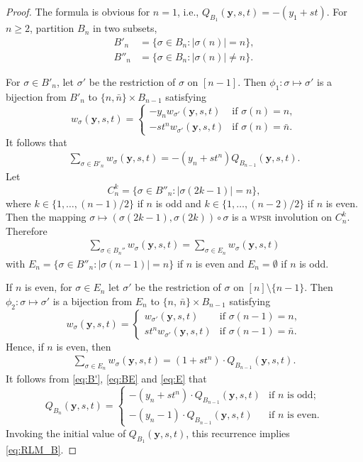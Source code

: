 \documentclass[12pt,reqno]{amsart}
\numberwithin{equation}{section}
\def\y{\mathbf{ y}}
\begin{document}
\begin{proof}
The formula is obvious  for $n=1$, i.e.,  $Q_{B_1}(\y,s,t)=-(y_1+st)$.
For $n\ge2$, partition $B_n$ in two subsets,
\begin{align*}
	B'_n&=\{\sigma\in B_n:|\sigma(n)|=n \},\\
	B''_n&=\{\sigma\in B_n:|\sigma(n)|\neq n  \}.
\end{align*}

For $\sigma\in B'_n$, 
let  $\sigma'$ be the restriction of $\sigma$ on $[n-1]$.  
Then $\phi_1: \sigma\mapsto \sigma'$ is a bijection 
 from $B'_n$ to $\{n, \bar n\}\times B_{n-1}$ satisfying 
  $$
  w_\sigma(\y,s,t)=\begin{cases}
  -y_nw_{\sigma'}(\y,s,t)&\textrm{if $\sigma(n)=n$},\\
  -st^n w_{\sigma'}(\y,s,t)&\textrm{if $\sigma(n)=\bar n$}.
  \end{cases}
  $$
  It follows that
\begin{align}\label{eq:B'}
	\sum_{\sigma\in B'_n }w_\sigma(\y,s,t)
	=-(y_n+st^n)Q_{B_{n-1}}(\y,s,t).
\end{align}
Let  
$$
C_n^k=\{\sigma\in B''_n: |\sigma(2k-1)|=n\},
$$
where $k\in \{1, \ldots, (n-1)/2\}$ if $n$ is odd and 
$k\in \{1, \ldots, (n-2)/2\}$ if $n$ is even.
Then the mapping $\sigma\mapsto (\sigma(2k-1), \sigma(2k))\circ \sigma$ is a \textsc{wpsr} involution on $C_n^k$. Therefore
\begin{align}\label{eq:BE}
\sum_{\sigma\in B_n''}w_\sigma(\y,s,t)=
\sum_{\sigma\in E_n}w_\sigma(\y,s,t)
\end{align}
with $E_n=\{\sigma\in B''_n: |\sigma(n-1)|=n\}$ if $n$ is even and $E_n=\emptyset$ if $n$ is odd.


If $n$ is even, 
for $\sigma\in E_n$ let  $\sigma'$ be the restriction of $\sigma$ on $[n]\setminus \{n-1\}$.  
Then $\phi_2: \sigma\mapsto \sigma'$ is a bijection 
 from $E_n$  to $\{n, \, \bar n\}\times B_{n-1}$ satisfying 
  $$
  w_\sigma(\y,s,t)=\begin{cases}
  w_{\sigma'}(\y,s,t)&\textrm{if $\sigma(n-1)=n$},\\
  st^n w_{\sigma'}(\y,s,t)&\textrm{if $\sigma(n-1)=\bar n$}.
  \end{cases}
  $$
Hence, if $n$ is even,
then
\begin{align}\label{eq:E}
\sum_{\sigma\in E_n}w_\sigma(\y,s,t)=(1+st^n)\cdot Q_{B_{n-1}}(\y,s,t). 
\end{align}
It follows from \eqref{eq:B'}, \eqref{eq:BE} and \eqref{eq:E} that
$$ 
Q_{B_n}(\y,s,t)=
\begin{cases}
-(y_n+st^n)\cdot Q_{B_{n-1}}(\y,s,t)&\textrm{if $n$ is odd};\\
-(y_n-1)\cdot Q_{B_{n-1}}(\y,s,t)&\textrm{if $n$ is even}.
   \end{cases}
   $$
Invoking the initial value of $Q_{B_{1}}(\y,s,t)$, 
this recurrence implies \eqref{eq:RLM_B}.
\end{proof}
\end{document}
